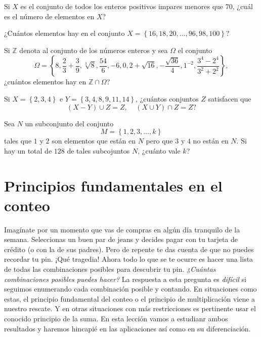 \documentclass[12pt]{article}
\begin{document}
\begin{ejercicio}
    Si $X$ es el conjunto de todos los enteros positivos impares menores que $70$, ¿cuál es el número de elementos en $X$?
\end{ejercicio}

\begin{ejercicio}
    ¿Cuántos elementos hay en el conjunto $X=\left\{16,18,20,\ldots,96,98,100\right\}$?
\end{ejercicio}

\begin{ejercicio}
     Si $\mathbb{Z}$ denota al conjunto de los números enteros y sea $\Omega$ el conjunto
    \[\Omega=\left\{8,\frac{2}{3}+\frac{3}{9},\sqrt[3]{8},\frac{54}{6},-6,0,2+\sqrt{16},-\frac{\sqrt{36}}{4},1^{-2},\frac{3^4-2^4}{3^2+2^2}\right\},\]
    ¿cuántos elementos hay en $\mathbb{Z}\cap \Omega$?
\end{ejercicio}

\begin{ejercicio}
     Si $X=\left\{2,3,4\right\}$ e $Y=\left\{3,4,8,9,11,14\right\}$, ¿cuántos conjuntos $Z$ satisfacen que
    \[(X-Y)\cup Z=Z,\;\;\;\; (X\cup Y)\cap Z=Z\text{?}\]
\end{ejercicio}

\begin{ejercicio}
    Sea $N$ un subconjunto del conjunto
    \[M=\left\{1,2,3,\ldots,k\right\}\]
    tales que $1$ y $2$ son elementos que están en $N$ pero que $3$ y $4$ no están en $N$. Si hay un total de $128$ de tales subcojuntos $N$, ¿cuánto  vale $k$?
\end{ejercicio}
\section{Principios fundamentales en el conteo}
Imagínate por un momento que vas de compras en algún día tranquilo de la semana. Seleccionas un buen par de jeans y decides pagar con tu tarjeta de crédito (o con la de sus padres). Pero de repente te das cuenta de que no puedes recordar tu pin. ¡Qué tragedia! Ahora todo lo que se te ocurre es hacer una lista de todas las combinaciones posibles para descubrir tu pin. \textit{¿Cuántas combinaciones posibles puedes hacer?} La respuesta a esta pregunta es \textit{difícil} si seguimos enumerando cada combinación posible y contando. En situaciones como estas, el principio fundamental del conteo o el principio de multiplicación viene a nuestro rescate. Y en otras situaciones con más restricciones es pertinente usar el conocido principio de la suma. En esta lección vamos a estudianr ambos resultados y haremos hincapié en las aplicaciones así como en su diferenciación.
\end{document}
